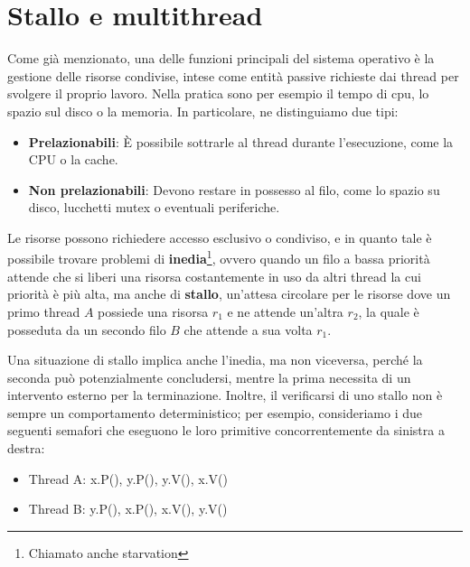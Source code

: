 \section{Stallo e multithread}
Come già menzionato, una delle funzioni principali del sistema operativo è la gestione delle risorse condivise, intese come entità passive richieste dai
thread per svolgere il proprio lavoro. Nella pratica sono per esempio il tempo di cpu, lo spazio sul disco o la memoria. In particolare, ne distinguiamo
due tipi: \begin{itemize}
    \item \textbf{Prelazionabili}: È possibile sottrarle al thread durante l'esecuzione, come la CPU o la cache.
    \item \textbf{Non prelazionabili}: Devono restare in possesso al filo, come lo spazio su disco, lucchetti mutex o eventuali periferiche.
\end{itemize}

\noindent Le risorse possono richiedere accesso esclusivo o condiviso, e in quanto tale è possibile trovare problemi di \textbf{inedia}\footnote{Chiamato
anche starvation}, ovvero quando un filo a bassa priorità attende che si liberi una risorsa costantemente in uso da altri thread la cui priorità è più
alta, ma anche di \textbf{stallo}, un'attesa circolare per le risorse dove un primo thread $A$ possiede una risorsa $r_1$ e ne attende un'altra $r_2$,
la quale è posseduta da un secondo filo $B$ che attende a sua volta $r_1$.\par
Una situazione di stallo implica anche l'inedia, ma non viceversa, perché la seconda può potenzialmente concludersi, mentre la prima necessita di un
intervento esterno per la terminazione. Inoltre, il verificarsi di uno stallo non è sempre un comportamento deterministico; per esempio, consideriamo i
due seguenti semafori che eseguono le loro primitive concorrentemente da sinistra a destra: \begin{itemize}
    \item Thread A: x.P(), y.P(), y.V(), x.V()
    \item Thread B: y.P(), x.P(), x.V(), y.V()
\end{itemize}

